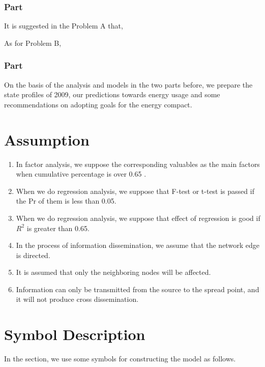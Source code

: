 \documentclass[a4paper,11pt]{article}
\begin{document}
\subsubsection{Part \uppercase\expandafter{}}
\par It is suggested in the Problem A that,

\par As for Problem B, 

\subsubsection{Part \uppercase\expandafter{}}
\par On the basis of the analysis and models in the two parts before, we prepare the state profiles of 2009, our predictions towards energy usage and some recommendations on adopting goals for the energy compact.


\section{Assumption}
\begin{enumerate}%
\renewcommand{\labelenumi}{(\theenumi)}
    \item In factor analysis, we suppose the corresponding valuables as the main factors when cumulative percentage is over 0.65 .
    \item When we do regression analysis, we suppose that F-test or t-test is passed if the Pr of them is less than 0.05.
    \item When we do regression analysis, we suppose that effect of regression is good if $R^{2}$ is greater than 0.65.
    \item In the process of information dissemination, we assume that the network edge is directed.
    \item It is assumed that only the neighboring nodes will be affected.
    \item Information can only be transmitted from the source to the spread point, and it will not produce cross dissemination.
\end{enumerate}



\section{Symbol Description}
In the section, we use some symbols for constructing the model as follows.
\end{document}
